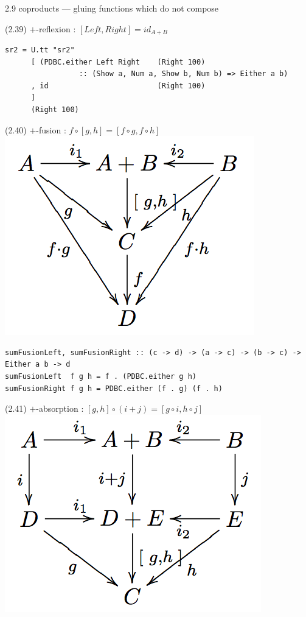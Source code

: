 \documentclass[presentation]{beamer}
\begin{document}
\begin{frame}[fragile,label=sec-8]{2.9 coproducts --- gluing functions which do not compose}
\begin{block}{(2.39) $+$-reflexion : $[ Left, Right ] = id_{A + B}$}
\begin{verbatim}
sr2 = U.tt "sr2"
      [ (PDBC.either Left Right    (Right 100)
                 :: (Show a, Num a, Show b, Num b) => Either a b)
      , id                         (Right 100)
      ]
      (Right 100)
\end{verbatim}
\end{block}

\begin{block}{(2.40) $+$-fusion : $f \circ [ g , h ] = [ f \circ g , f \circ h ]$}
\includegraphics[width=.9\linewidth]{./sum-fusion.png}

\begin{verbatim}
sumFusionLeft, sumFusionRight :: (c -> d) -> (a -> c) -> (b -> c) -> Either a b -> d
sumFusionLeft  f g h = f . (PDBC.either g h)
sumFusionRight f g h = PDBC.either (f . g) (f . h)
\end{verbatim}
\end{block}

\begin{block}{(2.41) $+$-absorption : $[ g , h ] \circ ( i + j ) = [ g \circ i, h \circ j ]$}
\includegraphics[width=.9\linewidth]{./sum-absorption.png}


\end{block}
\end{frame}
\end{document}
